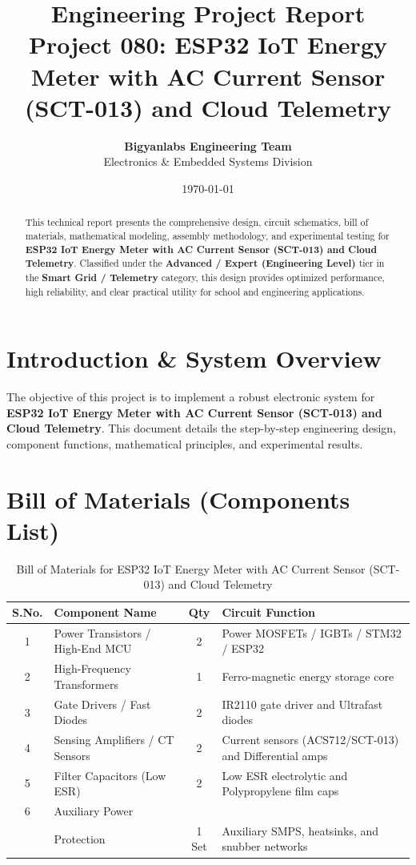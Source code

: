 \documentclass[11pt,a4paper]{article}
\title{\textbf{\Huge Engineering Project Report}\\[0.5em] \Large Project 080: ESP32 IoT Energy Meter with AC Current Sensor (SCT-013) and Cloud Telemetry}
\author{\textbf{Bigyanlabs Engineering Team}\\ Electronics \& Embedded Systems Division}
\date{\today}
\begin{document}
\maketitle
\thispagestyle{empty}

\begin{abstract}
This technical report presents the comprehensive design, circuit schematics, bill of materials, mathematical modeling, assembly methodology, and experimental testing for \textbf{ESP32 IoT Energy Meter with AC Current Sensor (SCT-013) and Cloud Telemetry}. Classified under the \textbf{Advanced / Expert (Engineering Level)} tier in the \textbf{Smart Grid / Telemetry} category, this design provides optimized performance, high reliability, and clear practical utility for school and engineering applications.
\end{abstract}

\newpage
\tableofcontents
\newpage

\section{Introduction \& System Overview}
The objective of this project is to implement a robust electronic system for \textbf{ESP32 IoT Energy Meter with AC Current Sensor (SCT-013) and Cloud Telemetry}. This document details the step-by-step engineering design, component functions, mathematical principles, and experimental results.

\section{Bill of Materials (Components List)}
\begin{table}[h!]
\centering
\caption{Bill of Materials for ESP32 IoT Energy Meter with AC Current Sensor (SCT-013) and Cloud Telemetry}
\vspace{0.5em}
\begin{tabular}{clcp{7cm}}
\toprule
\textbf{S.No.} & \textbf{Component Name} & \textbf{Qty} & \textbf{Circuit Function} \\
\midrule
1 & Power Transistors / High-End MCU & 2 & Power MOSFETs / IGBTs / STM32 / ESP32 \\
2 & High-Frequency Transformers & 1 & Ferro-magnetic energy storage core \\
3 & Gate Drivers / Fast Diodes & 2 & IR2110 gate driver and Ultrafast diodes \\
4 & Sensing Amplifiers / CT Sensors & 2 & Current sensors (ACS712/SCT-013) and Differential amps \\
5 & Filter Capacitors (Low ESR) & 2 & Low ESR electrolytic and Polypropylene film caps \\
6 & Auxiliary Power \\& Protection & 1 Set & Auxiliary SMPS, heatsinks, and snubber networks \\
\bottomrule
\end{tabular}
\end{table}
\end{document}
